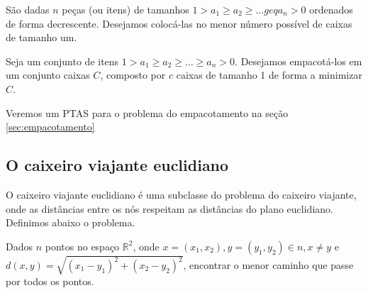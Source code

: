 São dadas $n$ peças (ou itens) de tamanhos $1 > a_1 \geq a_2 \geq \ldots geq a_n > 0 $ ordenados de forma decrescente. Desejamos colocá-las no menor número possível de caixas de tamanho um.

\begin{definition}
Seja um conjunto de itens $1 > a_1 \geq a_2 \geq \ldots \geq a_n > 0 $. Desejamos empacotá-los em um conjunto caixas $C$, composto por $c$ caixas de tamanho 1 de forma a minimizar $C$.
\end{definition}

Veremos um PTAS para o problema do empacotamento na seção \ref{sec:empacotamento}

\subsection{O caixeiro viajante euclidiano}

O caixeiro viajante euclidiano é uma subclasse do problema do caixeiro viajante, onde as distâncias entre os nós respeitam as distâncias do plano euclidiano. Definimos abaixo o problema.

\begin{definition}
Dados $n$ pontos no espaço $\mathbb{R}^2$, onde $x=(x_1,x_2),y=(y_1,y_2) \in n, x \neq y$ e $d(x,y) = \sqrt{ (x_1 - y_1)^2 + (x_2 - y_2)^2}$, encontrar o menor caminho que passe por todos os pontos.
\end{definition}


